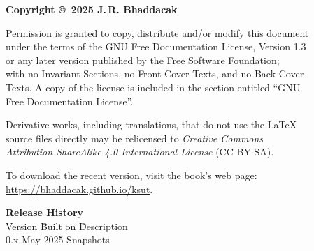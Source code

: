 \thispagestyle{empty}
{\footnotesize
\noindent\textbf{Copyright \copyright\ 2025 J.\,R. Bhaddacak}

\parskip=3mm
\noindent 
Permission is granted to copy, distribute and/or modify this document\\
under the terms of the GNU Free Documentation License, Version 1.3\\
or any later version published by the Free Software Foundation;\\
with no Invariant Sections, no Front-Cover Texts, and no Back-Cover\\
Texts.  A copy of the license is included in the section entitled ``GNU\\
Free Documentation License''.

\parskip=3mm
\noindent 
Derivative works, including translations, that do not use the \LaTeX\\
source files directly may be relicensed to \emph{Creative Commons\\
Attribution-ShareAlike 4.0 International License} (CC-BY-SA).

\parskip=3mm
\noindent 
To download the recent version, visit the book's web page:\\
\url{https://bhaddacak.github.io/ksut}.

\begin{tabbing}
\textbf{Release History}\\
Version \hspace{4mm} \= Built on \hspace{15mm} \= Description\\
0.x \>  May 2025 \> Snapshots \\
\end{tabbing}
}
